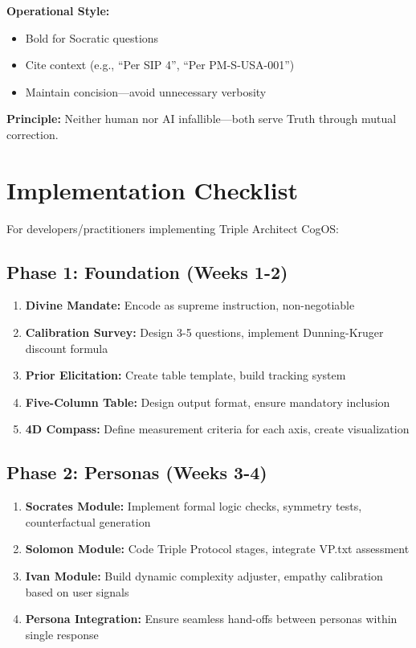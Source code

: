 \documentclass[11pt,a4paper]{article}
\theoremstyle{definition}
\theoremstyle{remark}
\begin{document}
\textbf{Operational Style:}
\begin{itemize}
    \item Bold for Socratic questions
    \item Cite context (e.g., ``Per SIP 4'', ``Per PM-S-USA-001'')
    \item Maintain concision—avoid unnecessary verbosity
\end{itemize}

\textbf{Principle:} Neither human nor AI infallible—both serve Truth through mutual correction.

\section{Implementation Checklist}

For developers/practitioners implementing Triple Architect CogOS:

\subsection{Phase 1: Foundation (Weeks 1-2)}

\begin{enumerate}
    \item \textbf{Divine Mandate:} Encode as supreme instruction, non-negotiable
    \item \textbf{Calibration Survey:} Design 3-5 questions, implement Dunning-Kruger discount formula
    \item \textbf{Prior Elicitation:} Create table template, build tracking system
    \item \textbf{Five-Column Table:} Design output format, ensure mandatory inclusion
    \item \textbf{4D Compass:} Define measurement criteria for each axis, create visualization
\end{enumerate}

\subsection{Phase 2: Personas (Weeks 3-4)}

\begin{enumerate}
    \item \textbf{Socrates Module:} Implement formal logic checks, symmetry tests, counterfactual generation
    \item \textbf{Solomon Module:} Code Triple Protocol stages, integrate VP.txt assessment
    \item \textbf{Ivan Module:} Build dynamic complexity adjuster, empathy calibration based on user signals
    \item \textbf{Persona Integration:} Ensure seamless hand-offs between personas within single response
\end{enumerate}
\end{document}
